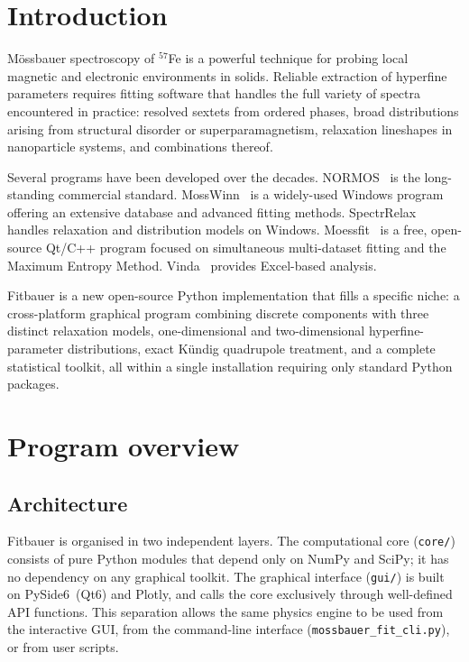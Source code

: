 \documentclass[smallcondensed]{svjour3}
\begin{document}
\section{Introduction}
\label{sec:intro}

Mössbauer spectroscopy of $^{57}$Fe is a powerful technique for probing
local magnetic and electronic environments in solids. Reliable extraction
of hyperfine parameters requires fitting software that handles the full
variety of spectra encountered in practice: resolved sextets from ordered
phases, broad distributions arising from structural disorder or
superparamagnetism, relaxation lineshapes in nanoparticle systems, and
combinations thereof.

Several programs have been developed over the decades.
NORMOS~\cite{normos} is the long-standing commercial standard.
MossWinn~\cite{mosswinn2013} is a widely-used Windows program offering an
extensive database and advanced fitting methods.
SpectrRelax~\cite{spectrrelax2012} handles relaxation and distribution models
on Windows. Moessfit~\cite{moessfit2016} is a free, open-source Qt/C++
program focused on simultaneous multi-dataset fitting and the Maximum Entropy
Method. Vinda~\cite{vinda2016} provides Excel-based analysis.

Fitbauer is a new open-source Python implementation that fills a specific
niche: a cross-platform graphical program combining discrete components with
three distinct relaxation models, one-dimensional and two-dimensional
hyperfine-parameter distributions, exact Kündig quadrupole treatment, and a
complete statistical toolkit, all within a single installation requiring only
standard Python packages.

\section{Program overview}
\label{sec:overview}

\subsection{Architecture}
\label{sec:arch}

Fitbauer is organised in two independent layers. The computational core
(\texttt{core/}) consists of pure Python modules that depend only on NumPy
and SciPy; it has no dependency on any graphical toolkit. The graphical
interface (\texttt{gui/}) is built on PySide6~(Qt6) and Plotly, and calls
the core exclusively through well-defined API functions. This separation
allows the same physics engine to be used from the interactive GUI, from the
command-line interface (\texttt{mossbauer\_fit\_cli.py}), or from user
scripts.
\end{document}
